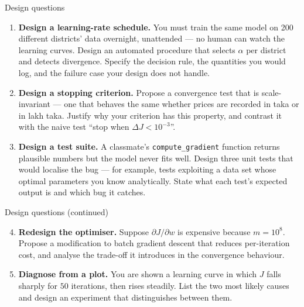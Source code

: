 \documentclass[aspectratio=169,11pt]{beamer}
\begin{document}
\begin{frame}{Design questions}
  \small
  \begin{enumerate}
    \item \textbf{Design a learning-rate schedule.} You must train the same model
          on 200 different districts' data overnight, unattended --- no human can
          watch the learning curves. Design an automated procedure that selects
          $\alpha$ per district and detects divergence. Specify the decision rule,
          the quantities you would log, and the failure case your design does not
          handle. \hfill{}
    \item \textbf{Design a stopping criterion.} Propose a convergence test that is
          scale-invariant --- one that behaves the same whether prices are
          recorded in taka or in lakh taka. Justify why your criterion has this
          property, and contrast it with the naive test
          ``stop when $\Delta J < 10^{-3}$''. \hfill{}
    \item \textbf{Design a test suite.} A classmate's \texttt{compute\_gradient}
          function returns plausible numbers but the model never fits well. Design
          three unit tests that would localise the bug --- for example, tests
          exploiting a data set whose optimal parameters you know analytically.
          State what each test's expected output is and which bug it catches.
          \hfill{}
  \end{enumerate}
\end{frame}

\begin{frame}{Design questions (continued)}
  \small
  \begin{enumerate}\setcounter{enumi}{3}
    \item \textbf{Redesign the optimiser.} Suppose $\partial J/\partial w$ is
          expensive because $m = 10^{8}$. Propose a modification to batch gradient
          descent that reduces per-iteration cost, and analyse the trade-off it
          introduces in the convergence behaviour. \hfill{}
    \item \textbf{Diagnose from a plot.} You are shown a learning curve in which
          $J$ falls sharply for $50$ iterations, then rises steadily. List the two
          most likely causes and design an experiment that distinguishes between
          them. \hfill{}
  \end{enumerate}
\end{frame}
\end{document}
